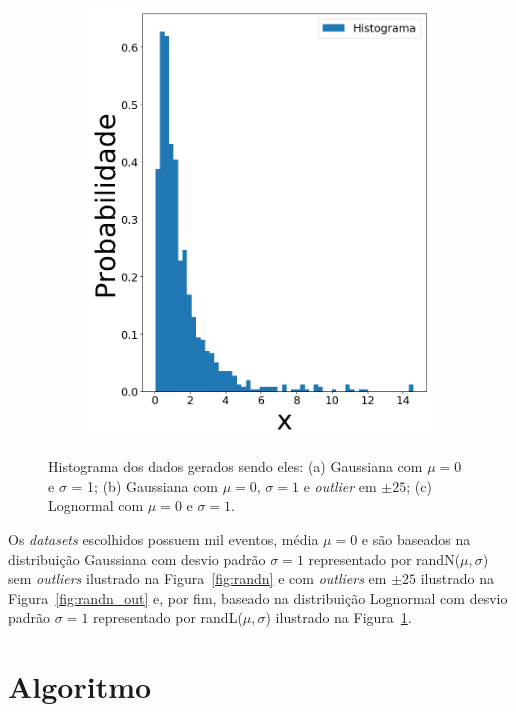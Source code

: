 \begin{figure}[H]
\begin{subfigure}[b]{0.27\textwidth}
		\includegraphics[width=\linewidth]{./figuras/datalognormal_0}
		\caption{}
		\label{fig:randlog}
	\end{subfigure}
	
	\caption{Histograma dos dados gerados sendo eles: (a) Gaussiana com $\mu = 0$ e $\sigma$ = 1; (b) Gaussiana com $\mu = 0$, $\sigma = 1$ e \textit{outlier} em $\pm 25$; (c) Lognormal com $\mu = 0$ e $\sigma = 1$.}
	\label{fig:data}
\end{figure}

Os \textit{datasets} escolhidos possuem mil eventos, média $ \mu = 0 $ e são baseados na distribuição Gaussiana com desvio padrão $ \sigma = 1 $ representado por randN($ \mu,\sigma $) sem \textit{outliers} ilustrado na Figura~\ref{fig:randn} e com \textit{outliers} em $ \pm 25 $ ilustrado  na Figura~\ref{fig:randn_out} e, por fim, baseado na distribuição Lognormal com desvio padrão $ \sigma = 1 $ representado por randL($ \mu,\sigma $) ilustrado na Figura~\ref{fig:randlog}.



\section{Algoritmo}

